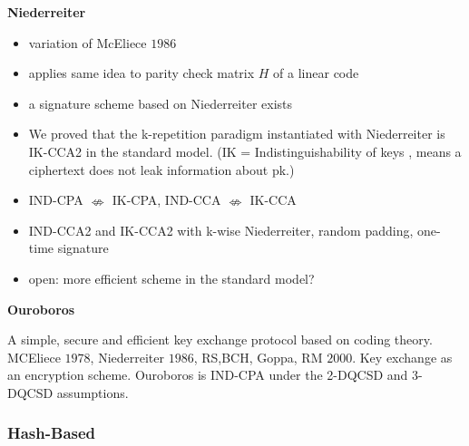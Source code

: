 \documentclass[a4paper,11pt]{article}
\begin{document}
\begin{multicols}{2}
\textbf{Niederreiter}
\begin{itemize} [noitemsep, nolistsep]
\item variation of McEliece $1986$
\item applies same idea to parity check matrix $H$ of a linear code
\item a signature scheme based on Niederreiter exists
\item We proved	that the k-repetition paradigm instantiated	with Niederreiter is IK-CCA2 in	the	standard model.	(IK = Indistinguishability	of keys , means	a ciphertext does not leak information about pk.)
\item IND-CPA $\nLeftrightarrow$ IK-CPA, IND-CCA $\nLeftrightarrow$ IK-CCA
\item IND-CCA2 and IK-CCA2 with k-wise Niederreiter, random padding, one-time signature
\item open: more efficient scheme in the standard model?
\end{itemize} 

\textbf{Ouroboros}

A simple, secure and efficient key exchange protocol based on coding theory. MCEliece $1978$, Niederreiter $1986$, RS,BCH, Goppa, RM $2000$. Key exchange as an encryption scheme. Ouroboros is IND-CPA under the 2-DQCSD and 3-DQCSD assumptions.

\subsubsection{Hash-Based}


\end{multicols}
\end{document}
